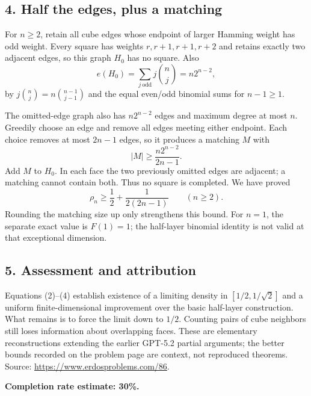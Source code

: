 \subsection*{4. Half the edges, plus a matching}
For $n\ge2$, retain all cube edges whose endpoint of larger Hamming weight has odd weight. Every square has weights $r,r+1,r+1,r+2$ and retains exactly two adjacent edges, so this graph $H_0$ has no square. Also
\[
 e(H_0)=\sum_{j\ \mathrm{odd}}j\binom nj=n2^{n-2},
\]
by $j\binom nj=n\binom{n-1}{j-1}$ and the equal even/odd binomial sums for $n-1\ge1$.

The omitted-edge graph also has $n2^{n-2}$ edges and maximum degree at most $n$. Greedily choose an edge and remove all edges meeting either endpoint. Each choice removes at most $2n-1$ edges, so it produces a matching $M$ with
\[
 |M|\ge\frac{n2^{n-2}}{2n-1}.
\]
Add $M$ to $H_0$. In each face the two previously omitted edges are adjacent; a matching cannot contain both. Thus no square is completed. We have proved
\[
 \rho_n\ge\frac12+\frac1{2(2n-1)}\qquad(n\ge2).\tag{4}
\]
Rounding the matching size up only strengthens this bound. For $n=1$, the separate exact value is $F(1)=1$; the half-layer binomial identity is not valid at that exceptional dimension.

\subsection*{5. Assessment and attribution}
Equations (2)--(4) establish existence of a limiting density in $[1/2,1/\sqrt2]$ and a uniform finite-dimensional improvement over the basic half-layer construction. What remains is to force the limit down to $1/2$. Counting pairs of cube neighbors still loses information about overlapping faces. These are elementary reconstructions extending the earlier GPT-5.2 partial arguments; the better bounds recorded on the problem page are context, not reproduced theorems.
Source: \url{https://www.erdosproblems.com/86}.

\textbf{Completion rate estimate: 30\%.}

